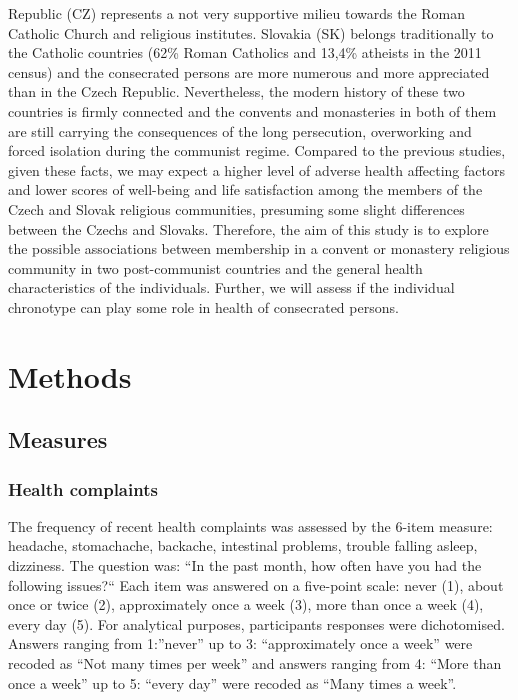 \documentclass[ijerph,article,accept,moreauthors,pdftex]{mdpi}
\begin{document}
Republic (CZ) represents a not very supportive milieu towards the Roman
Catholic Church and religious institutes. Slovakia (SK) belongs
traditionally to the Catholic countries (62\% Roman Catholics and 13,4\%
atheists in the 2011 census) and the consecrated persons are more
numerous and more appreciated than in the Czech Republic. Nevertheless,
the modern history of these two countries is firmly connected and the
convents and monasteries in both of them are still carrying the
consequences of the long persecution, overworking and forced isolation
during the communist regime. Compared to the previous studies, given
these facts, we may expect a higher level of adverse health affecting
factors and lower scores of well-being and life satisfaction among the
members of the Czech and Slovak religious communities, presuming some
slight differences between the Czechs and Slovaks. Therefore, the aim of
this study is to explore the possible associations between membership in
a convent or monastery religious community in two post-communist
countries and the general health characteristics of the individuals.
Further, we will assess if the individual chronotype can play some role
in health of consecrated persons.

\hypertarget{methods}{%
\section{Methods}\label{methods}}

\hypertarget{measures}{%
\subsection{Measures}\label{measures}}

\hypertarget{health-complaints}{%
\subsubsection{Health complaints}\label{health-complaints}}

The frequency of recent health complaints was assessed by the 6-item
measure: headache, stomachache, backache, intestinal problems, trouble
falling asleep, dizziness. The question was: ``In the past month, how
often have you had the following issues?{}`` Each item was answered on a
five-point scale: never (1), about once or twice (2), approximately once
a week (3), more than once a week (4), every day (5). For analytical
purposes, participants responses were dichotomised. Answers ranging from
1:''never'' up to 3: ``approximately once a week'' were recoded as ``Not
many times per week'' and answers ranging from 4: ``More than once a
week'' up to 5: ``every day'' were recoded as ``Many times a week''.
\end{document}
